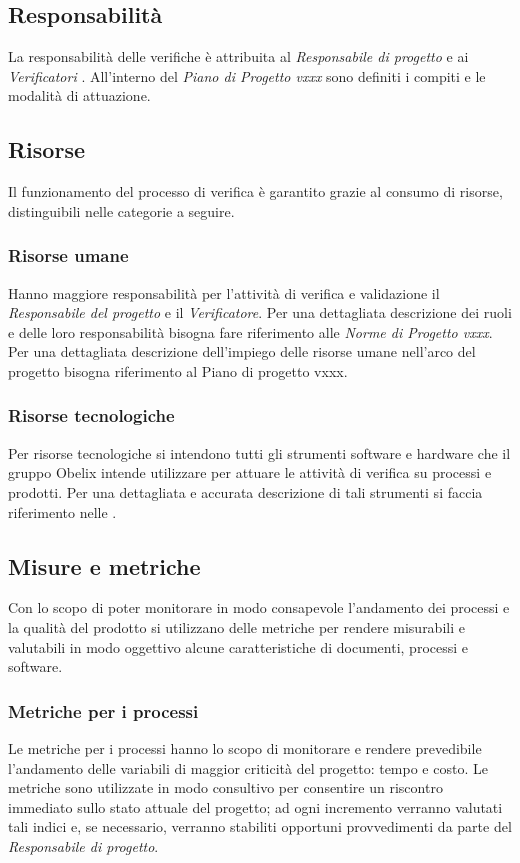 \subsection{Responsabilità}

La responsabilità delle verifiche è attribuita al  \emph{Responsabile di
  progetto} e ai  \emph{Verificatori} . All'interno del  \emph{Piano
  di Progetto vxxx}  sono definiti i compiti e le modalità di
attuazione.

\subsection{Risorse}
Il funzionamento del processo di verifica è garantito grazie al consumo di risorse, distinguibili
nelle categorie a seguire.
\subsubsection{Risorse umane}

Hanno maggiore responsabilità per l'attività di verifica
e validazione il \emph{Responsabile del progetto} e il
\emph{Verificatore}. Per una dettagliata descrizione dei ruoli e delle
loro responsabilità bisogna fare riferimento alle \emph{Norme di
  Progetto vxxx}. Per una dettagliata descrizione dell'impiego delle
risorse umane nell'arco del progetto bisogna riferimento al Piano di
progetto vxxx.

\subsubsection{Risorse tecnologiche}
Per risorse tecnologiche si intendono
tutti gli strumenti software e hardware che il gruppo Obelix intende
utilizzare per attuare le attività di verifica su processi e
prodotti. Per una dettagliata e accurata descrizione di tali strumenti
si faccia riferimento nelle \emph{\normediprogetto}.



\subsection{Misure e metriche}
Con lo scopo di poter monitorare in modo consapevole l'andamento dei
processi e la qualità del prodotto si utilizzano delle metriche per
rendere misurabili e valutabili in modo oggettivo alcune
caratteristiche di documenti, processi e software.


\subsubsection{Metriche per i processi}
Le metriche per i processi hanno lo scopo  di monitorare e rendere
prevedibile l’andamento delle variabili di maggior criticità del
progetto: tempo e costo. Le metriche sono utilizzate in modo consultivo
per consentire un riscontro immediato sullo stato attuale del
progetto; ad ogni incremento verranno valutati tali indici e, se
necessario, verranno stabiliti opportuni provvedimenti da parte del  \emph{Responsabile di progetto}.

